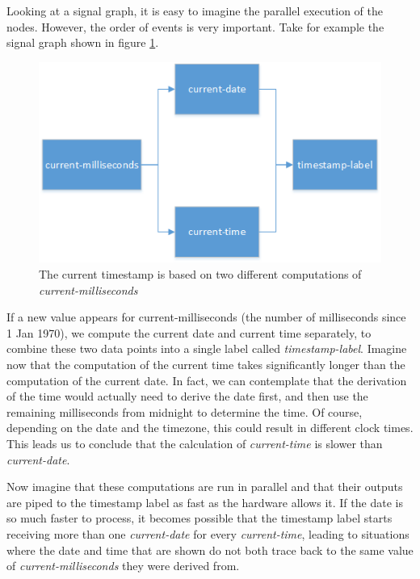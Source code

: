 Looking at a signal graph, it is easy to imagine the parallel execution of the nodes. However, the order of events is very important. 
Take for example the signal graph shown in figure \ref{fig:relatedwork-elm-eventsorder}.

\begin{figure}[h!]
	\includegraphics[width=\textwidth]{images/RelatedWork-Elm-EventsOrder.png}
	\caption{The current timestamp is based on two different computations of \textit{current-milliseconds}}
	\label{fig:relatedwork-elm-eventsorder}
\end{figure}

If a new value appears for current-milliseconds (the number of milliseconds since 1 Jan 1970), we compute the current date and current time separately, to combine these two data points into a single label called \textit{timestamp-label}. Imagine now that the computation of the current time takes significantly longer than the computation of the current date. In fact, we can contemplate that the derivation of the time would actually need to derive the date first, and then use the remaining milliseconds from midnight to determine the time. Of course, depending on the date and the timezone, this could result in different clock times.
This leads us to conclude that the calculation of \textit{current-time} is slower than \textit{current-date}. 

Now imagine that these computations are run in parallel and that their outputs are piped to the timestamp label as fast as the hardware allows it. If the date is so much faster to process, it becomes possible that the timestamp label starts receiving more than one \textit{current-date} for every \textit{current-time}, leading to situations where the date and time that are shown do not both trace back to the same value of \textit{current-milliseconds} they were derived from. 

